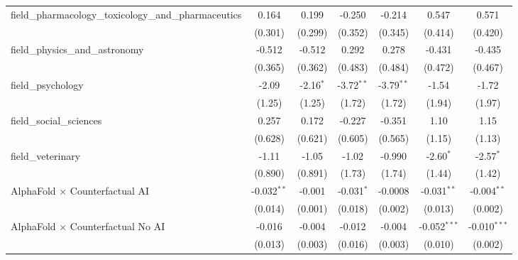 \begin{tabular}{lcccccc}
   field\_pharmacology\_toxicology\_and\_pharmaceutics         & 0.164         & 0.199        & -0.250       & -0.214       & 0.547          & 0.571\\   
                                                               & (0.301)       & (0.299)      & (0.352)      & (0.345)      & (0.414)        & (0.420)\\   
   field\_physics\_and\_astronomy                              & -0.512        & -0.512       & 0.292        & 0.278        & -0.431         & -0.435\\   
                                                               & (0.365)       & (0.362)      & (0.483)      & (0.484)      & (0.472)        & (0.467)\\   
   field\_psychology                                           & -2.09         & -2.16$^{*}$  & -3.72$^{**}$ & -3.79$^{**}$ & -1.54          & -1.72\\   
                                                               & (1.25)        & (1.25)       & (1.72)       & (1.72)       & (1.94)         & (1.97)\\   
   field\_social\_sciences                                     & 0.257         & 0.172        & -0.227       & -0.351       & 1.10           & 1.15\\   
                                                               & (0.628)       & (0.621)      & (0.605)      & (0.565)      & (1.15)         & (1.13)\\   
   field\_veterinary                                           & -1.11         & -1.05        & -1.02        & -0.990       & -2.60$^{*}$    & -2.57$^{*}$\\   
                                                               & (0.890)       & (0.891)      & (1.73)       & (1.74)       & (1.44)         & (1.42)\\   
   AlphaFold $\times$ Counterfactual AI                        & -0.032$^{**}$ & -0.001       & -0.031$^{*}$ & -0.0008      & -0.031$^{**}$  & -0.004$^{**}$\\   
                                                               & (0.014)       & (0.001)      & (0.018)      & (0.002)      & (0.013)        & (0.002)\\   
   AlphaFold $\times$ Counterfactual No AI                     & -0.016        & -0.004       & -0.012       & -0.004       & -0.052$^{***}$ & -0.010$^{***}$\\   
                                                               & (0.013)       & (0.003)      & (0.016)      & (0.003)      & (0.010)        & (0.002)\\   

\end{tabular}
